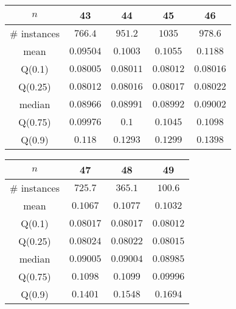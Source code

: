 \begin{tabular}{c|cccc} 
\hline 
$n$ & 43 & 44 & 45 & 46 \tabularnewline 
\hline 
\hline 
\# instances & $766.4$ & $951.2$ & $1035$ & $978.6$ \tabularnewline 
mean & $0.09504$ & $0.1003$ & $0.1055$ & $0.1188$ \tabularnewline 
Q(0.1) & $0.08005$ & $0.08011$ & $0.08012$ & $0.08016$ \tabularnewline 
Q(0.25) & $0.08012$ & $0.08016$ & $0.08017$ & $0.08022$ \tabularnewline 
median & $0.08966$ & $0.08991$ & $0.08992$ & $0.09002$ \tabularnewline 
Q(0.75) & $0.09976$ & $0.1$ & $0.1045$ & $0.1098$ \tabularnewline 
Q(0.9) & $0.118$ & $0.1293$ & $0.1299$ & $0.1398$ \tabularnewline 
\hline 
\end{tabular} 
\medskip{} 

\begin{tabular}{c|ccc} 
\hline 
$n$ & 47 & 48 & 49 \tabularnewline 
\hline 
\hline 
\# instances & $725.7$ & $365.1$ & $100.6$ \tabularnewline 
mean & $0.1067$ & $0.1077$ & $0.1032$ \tabularnewline 
Q(0.1) & $0.08017$ & $0.08017$ & $0.08012$ \tabularnewline 
Q(0.25) & $0.08024$ & $0.08022$ & $0.08015$ \tabularnewline 
median & $0.09005$ & $0.09004$ & $0.08985$ \tabularnewline 
Q(0.75) & $0.1098$ & $0.1099$ & $0.09996$ \tabularnewline 
Q(0.9) & $0.1401$ & $0.1548$ & $0.1694$ \tabularnewline 
\hline 
\end{tabular} 
\medskip{} 

